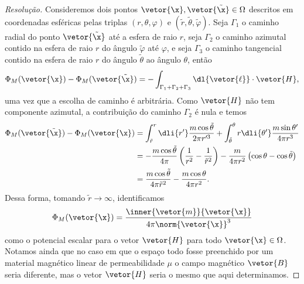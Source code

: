 \begin{proof}[Resolução]
    Consideremos dois pontos \(\vetor{\x}, \vetor{\tilde{\x}} \in \Omega\) descritos em coordenadas esféricas pelas triplas \((r, \theta, \varphi)\) e \((\tilde{r}, \tilde{\theta}, \tilde{\varphi})\). Seja \(\Gamma_1\) o caminho radial do ponto \(\vetor{\tilde{\x}}\) até a esfera de raio \(r\), seja \(\Gamma_2\) o caminho azimutal contido na esfera de raio \(r\) do ângulo \(\tilde{\varphi}\) até \(\varphi\), e seja \(\Gamma_3\) o caminho tangencial contido na esfera de raio \(r\) do ângulo \(\tilde{\theta}\) ao ângulo \(\theta\), então
    \begin{equation*}
        \Phi_M(\vetor{\x}) - \Phi_M(\vetor{\tilde{\x}}) = - \int_{\Gamma_1 + \Gamma_2 + \Gamma_3} \dl{\vetor{\ell}}\cdot \vetor{H},
    \end{equation*}
    uma vez que a escolha de caminho é arbitrária. Como \(\vetor{H}\) não tem componente azimutal, a contribuição do caminho \(\Gamma_2\) é nula e temos
    \begin{align*}
        \Phi_M(\vetor{\tilde{\x}}) - \Phi_M(\vetor{\x})
        &= \int_{\tilde{r}}^r \dli{r'} \frac{m \cos\tilde{\theta}}{2\pi r'^3} + \int_{\tilde\theta}^\theta r \dli{\theta'} \frac{m \sin\theta'}{4\pi r^3}\\
        &= -\frac{m \cos\tilde{\theta}}{4\pi}\left(\frac1{r^2} - \frac1{\tilde{r}^2}\right) - \frac{m}{4\pi r^2}\left(\cos\theta - \cos\tilde\theta\right)\\
        &= \frac{m \cos\tilde{\theta}}{4\pi \tilde{r}^2} - \frac{m \cos\theta}{4\pi r^2}.
    \end{align*}
    Dessa forma, tomando \(\tilde{r} \to \infty\), identificamos
    \begin{equation*}
        \Phi_M(\vetor{\x}) = \frac{\inner{\vetor{m}}{\vetor{\x}}}{4\pi \norm{\vetor{\x}}^3}
    \end{equation*}
    como o potencial escalar para o vetor \(\vetor{H}\) para todo \(\vetor{\x}\in \Omega\). Notamos ainda que no caso em que o espaço todo fosse preenchido por um material magnético linear de permeabilidade \(\mu\) o campo magnético \(\vetor{B}\) seria diferente, mas o vetor \(\vetor{H}\) seria o mesmo que aqui determinamos.
\end{proof}
